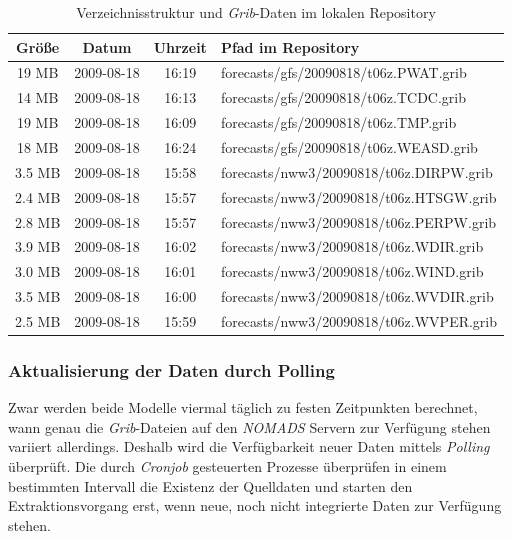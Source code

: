 \begin{table}[h]
  \centering
  {\sf
    \footnotesize
    \begin{longtable}{@{}cccl}
      \toprule
      \textbf{Größe} & \textbf{Datum} & \textbf{Uhrzeit} & \textbf{Pfad im Repository} \\
      \midrule
      19 MB & 2009-08-18 & 16:19 & forecasts/gfs/20090818/t06z.PWAT.grib \\
      14 MB & 2009-08-18 & 16:13 & forecasts/gfs/20090818/t06z.TCDC.grib \\
      19 MB & 2009-08-18 & 16:09 & forecasts/gfs/20090818/t06z.TMP.grib \\
      18 MB & 2009-08-18 & 16:24 & forecasts/gfs/20090818/t06z.WEASD.grib \\
      \midrule
      3.5 MB & 2009-08-18 & 15:58 & forecasts/nww3/20090818/t06z.DIRPW.grib \\
      2.4 MB & 2009-08-18 & 15:57 & forecasts/nww3/20090818/t06z.HTSGW.grib \\
      2.8 MB & 2009-08-18 & 15:57 & forecasts/nww3/20090818/t06z.PERPW.grib \\
      3.9 MB & 2009-08-18 & 16:02 & forecasts/nww3/20090818/t06z.WDIR.grib \\
      3.0 MB & 2009-08-18 & 16:01 & forecasts/nww3/20090818/t06z.WIND.grib \\
      3.5 MB & 2009-08-18 & 16:00 & forecasts/nww3/20090818/t06z.WVDIR.grib \\
      2.5 MB & 2009-08-18 & 15:59 & forecasts/nww3/20090818/t06z.WVPER.grib \\
      \bottomrule
    \end{longtable}
  }
  \caption{Verzeichnisstruktur und \textit{Grib}-Daten im lokalen Repository}
  \label{tab:repository}
\end{table}

\subsubsection{Aktualisierung der Daten durch Polling}
Zwar werden beide Modelle viermal täglich zu festen Zeitpunkten
berechnet, wann genau die \textit{Grib}-Dateien auf den
\textit{NOMADS} Servern zur Verfügung stehen variiert
allerdings. Deshalb wird die Verfügbarkeit neuer Daten mittels
\textit{Polling} überprüft. Die durch \textit{Cronjob} gesteuerten
Prozesse überprüfen in einem bestimmten Intervall die Existenz der
Quelldaten und starten den Extraktionsvorgang erst, wenn neue, noch
nicht integrierte Daten zur Verfügung stehen.

